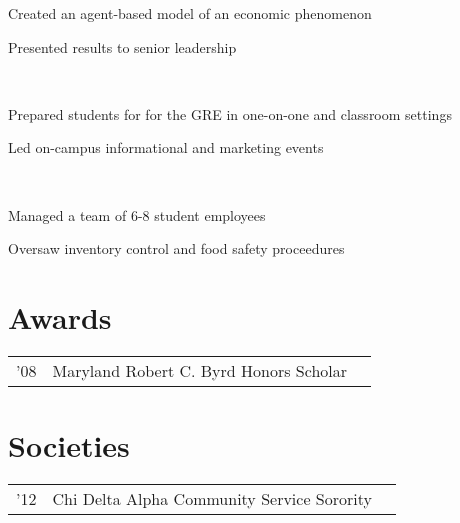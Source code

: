\documentclass[]{deedy-resume-openfont}
\begin{document}
\begin{minipage}[t]{0.66\textwidth}
\begin{tightemize}\item Created an agent-based model of an economic phenomenon
\item Presented results to senior leadership
\end{tightemize}
\sectionsep

 \\
\begin{tightemize}
\item Prepared students for for the GRE in one-on-one and classroom settings
\item Led on-campus informational and marketing events
\end{tightemize}
\sectionsep

 \\
\begin{tightemize}
\item Managed a team of 6-8 student employees
\item Oversaw inventory control and food safety proceedures
\end{tightemize}
\sectionsep

\sectionsep



\section{Awards} 
\begin{tabular}{rll}
'08	& Maryland Robert C. Byrd Honors Scholar \\
\end{tabular}
\sectionsep


\section{Societies} 

\begin{tabular}{rll}
'12 	& Chi Delta Alpha Community Service Sorority\\
\end{tabular}
\sectionsep

\end{minipage} 
\end{document}
